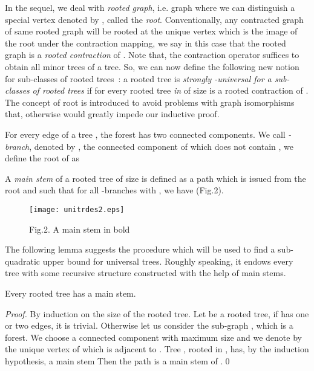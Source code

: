 \documentclass{llncs}
\begin{document}
In the sequel, we deal with\textit{ rooted graph}, i.e. graph 
where we can distinguish a special vertex denoted by ,
called the \textit{root}. Conventionally, any contracted graph
 of same rooted graph  will be rooted at the unique
vertex which is the image of the root under the contraction
mapping, we say in this case that the rooted graph  is a
\textit{rooted contraction} of . Note that, the contraction
operator suffices to obtain all minor trees of a tree. So, we can
now define the following new notion for sub-classes of rooted
trees~: a rooted tree  is\textit{ strongly -universal
for a sub-classes }\textit{ of rooted trees} if for every
rooted tree \textit{ in } of size  is a rooted
contraction of . The concept of root is introduced to
avoid problems with graph isomorphisms that, otherwise would
greatly impede our inductive proof.

For every edge  of a tree , the forest  has two connected
components. We call \textit{-branch}, denoted by , the connected component of
 which does not contain , we define the root of
 as 

A\textit{ main stem }of a rooted tree of size  is defined as a
path  which is issued from the root and such that for all
-branches  with , we have
 (Fig.2).

\begin{figure}[htbp]
\centerline{\texttt{[image: unitrdes2.eps]}}
\label{fig2}
\begin{center}
Fig.2. A main stem in bold
\end{center}
\end{figure}



The following lemma suggests the procedure which will be used to find a
sub-quadratic upper bound for universal trees. Roughly speaking, it endows
every tree with some recursive structure constructed with the help of main
stems.





\begin{lemma} Every rooted tree has a main stem.
\end{lemma}




\begin{proof}By induction on the size of the rooted tree. Let  be a rooted tree, if  has
one or two edges, it is trivial. Otherwise let us consider the
sub-graph , which is a forest. We
choose a connected component  with maximum size and we
denote by  the unique vertex of  which is adjacent to
. Tree , rooted in , has, by the induction
hypothesis, a main stem  Then the path  is a main stem of .\qed
\end{proof}
\end{document}
